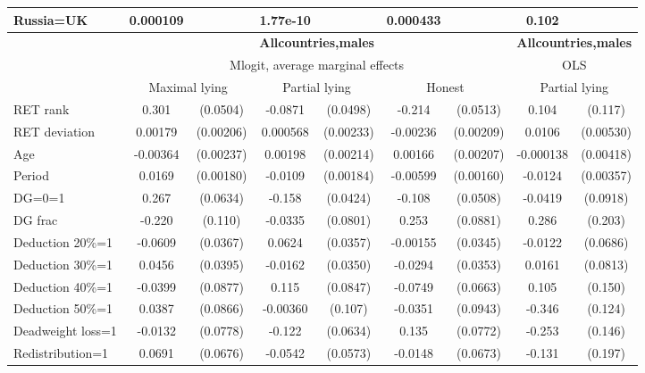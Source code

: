 \begin{tabular}{l|cccccc|cc}
Russia=UK       & 0.000109         &         & 1.77e-10         &         & 0.000433         &         &    0.102         &         \\
\hline\hline
&\multicolumn{6}{c|}{\bf All\space{}countries,\space{}males}&\multicolumn{2}{c}{\bf All\space{}countries,\space{}males}\\ &\multicolumn{6}{c|}{Mlogit, average marginal effects }&\multicolumn{2}{c}{OLS}\\
                &\multicolumn{2}{c}{Maximal lying}&\multicolumn{2}{c}{Partial lying}&\multicolumn{2}{c}{Honest}  &\multicolumn{2}{c}{Partial lying}\\
\hline
RET rank        &    0.301\sym{***}& (0.0504)&  -0.0871\sym{*}  & (0.0498)&   -0.214\sym{***}& (0.0513)&    0.104         &  (0.117)\\
RET deviation   &  0.00179         &(0.00206)& 0.000568         &(0.00233)& -0.00236         &(0.00209)&   0.0106\sym{**} &(0.00530)\\
Age             & -0.00364         &(0.00237)&  0.00198         &(0.00214)&  0.00166         &(0.00207)&-0.000138         &(0.00418)\\
Period          &   0.0169\sym{***}&(0.00180)&  -0.0109\sym{***}&(0.00184)& -0.00599\sym{***}&(0.00160)&  -0.0124\sym{***}&(0.00357)\\
DG=0=1          &    0.267\sym{***}& (0.0634)&   -0.158\sym{***}& (0.0424)&   -0.108\sym{**} & (0.0508)&  -0.0419         & (0.0918)\\
DG frac         &   -0.220\sym{**} &  (0.110)&  -0.0335         & (0.0801)&    0.253\sym{***}& (0.0881)&    0.286         &  (0.203)\\
Deduction 20\%=1&  -0.0609\sym{*}  & (0.0367)&   0.0624\sym{*}  & (0.0357)& -0.00155         & (0.0345)&  -0.0122         & (0.0686)\\
Deduction 30\%=1&   0.0456         & (0.0395)&  -0.0162         & (0.0350)&  -0.0294         & (0.0353)&   0.0161         & (0.0813)\\
Deduction 40\%=1&  -0.0399         & (0.0877)&    0.115         & (0.0847)&  -0.0749         & (0.0663)&    0.105         &  (0.150)\\
Deduction 50\%=1&   0.0387         & (0.0866)& -0.00360         &  (0.107)&  -0.0351         & (0.0943)&   -0.346\sym{***}&  (0.124)\\
Deadweight loss=1&  -0.0132         & (0.0778)&   -0.122\sym{*}  & (0.0634)&    0.135\sym{*}  & (0.0772)&   -0.253\sym{*}  &  (0.146)\\
Redistribution=1&   0.0691         & (0.0676)&  -0.0542         & (0.0573)&  -0.0148         & (0.0673)&   -0.131         &  (0.197)\\

\end{tabular}
